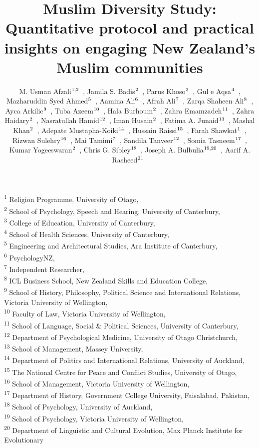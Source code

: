 \documentclass[
]{interact}
\title{Muslim Diversity Study: Quantitative protocol and practical
insights on engaging New Zealand's Muslim communities}
\author{M. Usman
Afzali$\textsuperscript{1,2}$~\orcidlink{0000-0001-5119-9388}, Jamila S.
Badis$\textsuperscript{2}$~\orcidlink{0009-0005-2866-5033}, Parus
Khoso$\textsuperscript{3}$~\orcidlink{0000-0001-6384-038X}, Gul e
Aqsa$\textsuperscript{4}$~\orcidlink{0009-0003-0928-8039}, Mazharuddin
Syed Ahmed$\textsuperscript{5}$~\orcidlink{0009-0006-9799-4049}, Aamina
Ali$\textsuperscript{6}$~\orcidlink{0009-0000-8153-8432}, Afrah
Ali$\textsuperscript{7}$~\orcidlink{0009-0004-5856-4025}, Zarqa Shaheen
Ali$\textsuperscript{8}$~\orcidlink{0000-0002-7145-5788}, Ayca
Arkilic$\textsuperscript{9}$~\orcidlink{0000-0002-1775-3311}, Tuba
Azeem$\textsuperscript{10}$~\orcidlink{0000-0002-0611-8726}, Hala
Burhoum$\textsuperscript{2}$~\orcidlink{0009-0004-3867-2029}, Zahra
Emamzadeh$\textsuperscript{11}$~\orcidlink{0009-0007-3065-2199}, Zahra
Haidary$\textsuperscript{2}$~\orcidlink{0009-0000-5259-622X}, Nasratullah
Hamid$\textsuperscript{12}$~\orcidlink{0009-0002-0120-7428}, Iman
Husain$\textsuperscript{2}$~\orcidlink{0000-0003-4032-4387}, Fatima A.
Junaid$\textsuperscript{13}$~\orcidlink{0000-0002-6656-8120}, Mashal
Khan$\textsuperscript{2}$~\orcidlink{0009-0004-5903-3306}, Adepate
Mustapha-Koiki$\textsuperscript{14}$~\orcidlink{0000-0003-4731-1781}, Hussain
Raissi$\textsuperscript{15}$~\orcidlink{0009-0000-7985-1622}, Farah
Shawkat$\textsuperscript{1}$~\orcidlink{0009-0006-0319-9117}, Rizwan
Sulehry$\textsuperscript{16}$~\orcidlink{0000-0002-1209-0635}, Mai
Tamimi$\textsuperscript{7}$~\orcidlink{0009-0001-7894-7259}, Sandila
Tanveer$\textsuperscript{12}$~\orcidlink{0000-0002-0648-5382}, Somia
Tasneem$\textsuperscript{17}$~\orcidlink{0000-0001-5471-6934}, Kumar
Yogeeswaran$\textsuperscript{2}$~\orcidlink{0000-0002-1978-5077}, Chris
G. Sibley$\textsuperscript{18}$~\orcidlink{0000-0002-4064-8800}, Joseph
A.
Bulbulia$\textsuperscript{19,20}$~\orcidlink{0000-0002-5861-2056}, Aarif
A. Rasheed$\textsuperscript{21}$~\orcidlink{0009-0004-7513-430X}}
\begin{document}
\captionsetup{labelsep=space}
\maketitle
\textsuperscript{1} Religion Programme, University of
Otago,  \\ \textsuperscript{2} School of Psychology, Speech and
Hearing, University of Canterbury,  \\ \textsuperscript{3} College of
Education, University of Canterbury,  \\ \textsuperscript{4} School of
Health Sciences, University of
Canterbury,  \\ \textsuperscript{5} Engineering and Architectural
Studies, Ara Institute of
Canterbury,  \\ \textsuperscript{6}  PsychologyNZ,  \\ \textsuperscript{7}  Independent
Researcher,  \\ \textsuperscript{8} ICL Business School, New Zealand
Skills and Education College,  \\ \textsuperscript{9} School of History,
Philosophy, Political Science and International Relations, Victoria
University of Wellington,  \\ \textsuperscript{10} Faculty of
Law, Victoria University of Wellington,  \\ \textsuperscript{11} School
of Language, Social \& Political Sciences, University of
Canterbury,  \\ \textsuperscript{12} Department of Psychological
Medicine, University of Otago
Christchurch,  \\ \textsuperscript{13} School of Management, Massey
University,  \\ \textsuperscript{14} Department of Politics and
International Relations, University of
Auckland,  \\ \textsuperscript{15} The National Centre for Peace and
Conflict Studies, University of Otago,  \\ \textsuperscript{16} School
of Management, Victoria University of
Wellington,  \\ \textsuperscript{17} Department of History, Government
College University, Faisalabad,
Pakistan,  \\ \textsuperscript{18} School of Psychology, University of
Auckland,  \\ \textsuperscript{19} School of Psychology, Victoria
University of Wellington,  \\ \textsuperscript{20} Department of
Linguistic and Cultural Evolution, Max Planck Institute for Evolutionary
\end{document}

